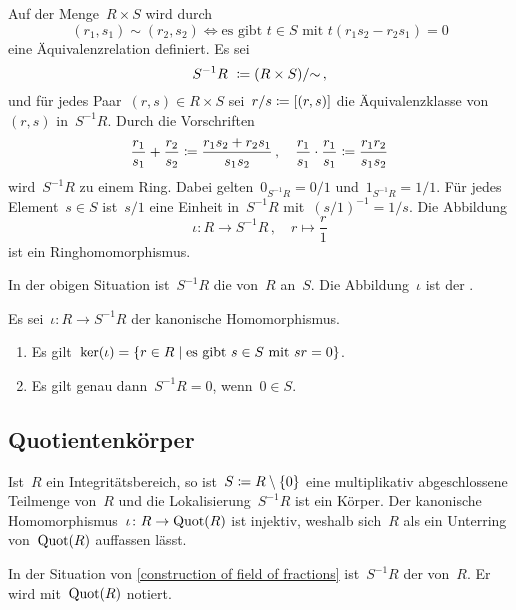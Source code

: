 Auf der Menge~$R \times S$ wird durch
\[
  (r_1, s_1) \sim (r_2, s_2)
  \iff
  \text{es gibt~$t \in S$ mit~$t(r_1 s_2 - r_2 s_1) = 0$}
\]
eine Äquivalenzrelation definiert.
Es sei
\[
  S^{-1} R \defined (R \times S) / {\sim} \,,
\]
und für jedes Paar~$(r,s) \in R \times S$ sei~$r/s \coloneqq [(r,s)]$ die Äquivalenzklasse von~$(r,s)$ in~$S^{-1} R$.
Durch die Vorschriften
\[
  \frac{r_1}{s_1} + \frac{r_2}{s_2}
  \coloneqq
  \frac{r_1 s_2 + r_2 s_1}{s_1 s_2} \,,
  \quad
  \frac{r_1}{s_1} \cdot \frac{r_1}{s_1}
  \coloneqq
  \frac{r_1 r_2}{s_1 s_2}
\]
wird~$S^{-1} R$ zu einem Ring.
Dabei gelten~$0_{S^{-1} R} = 0/1$ und~$1_{S^{-1} R} = 1/1$.
Für jedes Element~$s \in S$ ist~$s/1$ eine Einheit in~$S^{-1} R$ mit~$(s/1)^{-1} = 1/s$.
Die Abbildung
\[
  \iota
  \colon
  R \to S^{-1} R \,,
  \quad
  r \mapsto \frac{r}{1}
\]
ist ein Ringhomomorphismus.

\begin{definition}
  In der obigen Situation ist~$S^{-1} R$ die  von~$R$ an~$S$.
  Die Abbildung~$\iota$ ist der .
\end{definition}

\begin{proposition}
  Es sei~$\iota \colon R \to S^{-1} R$ der kanonische Homomorphismus.
  \begin{enumerate}
    \item
      Es gilt~$\ker(\iota) = \{ r \in R \suchthat \text{es gibt~$s \in S$ mit~$sr = 0$} \}$.
    \item
      Es gilt genau dann~$S^{-1} R = 0$, wenn~$0 \in S$.
  \end{enumerate}
\end{proposition}



\subsection{Quotientenkörper}

\begin{example}
  \label{construction of field of fractions}
  Ist~$R$ ein Integritätsbereich, so ist~$S \coloneqq R \setminus \{ 0 \}$ eine multiplikativ abgeschlossene Teilmenge von~$R$ und die Lokalisierung~$S^{-1} R$ ist ein Körper.
  Der kanonische Homomorphismus~$\iota \colon R \to \Quot(R)$ ist injektiv, weshalb sich~$R$ als ein Unterring von~$\operatorname{Quot}(R)$ auffassen lässt.
\end{example}

\begin{definition}
  In der Situation von \cref{construction of field of fractions} ist~$S^{-1} R$ der  von~$R$.
  Er wird mit~$\operatorname{Quot}(R)$ notiert.
\end{definition}

